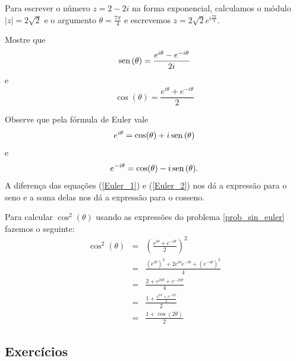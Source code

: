 \begin{ex}Para escrever o número $z=2-2i$ na forma exponencial, calculamos o módulo $|z|=2\sqrt{2}$ e o argumento $\theta=\frac{7\pi}{4}$ e escrevemos $z=2\sqrt{2}e^{i\frac{7\pi}{4}}$. 
\end{ex}
\begin{ex}{\label{prob_sin_euler}}Mostre que
\begin{equation}
\operatorname{sen}\,(\theta)=\frac{e^{i\theta}-e^{-i\theta}}{2i}
\end{equation}
e
\begin{equation}
\cos(\theta)=\frac{e^{i\theta}+e^{-i\theta}}{2}
\end{equation}

Observe que pela fórmula de Euler vale
\begin{equation}{\label{Euler_1}}
e^{i\theta}=\cos(\theta)+i\operatorname{sen}\,(\theta)
\end{equation}
e
\begin{equation}{\label{Euler_2}}
e^{-i\theta}=\cos(\theta)-i\operatorname{sen}\,(\theta).
\end{equation}
A diferença das equações (\ref{Euler_1}) e (\ref{Euler_2}) nos dá a expressão para o seno e a soma delas nos dá a expressão para o cosseno.
\end{ex}
\begin{ex}Para calcular $\cos^2(\theta)$ usando as expressões do problema \ref{prob_sin_euler} fazemos o seguinte:
\begin{eqnarray*}
\cos^2(\theta)&=&\left(\frac{e^{i\theta}+e^{-i\theta}}{2}\right)^2\\
&=&\frac{\left(e^{i\theta}\right)^2+2e^{i\theta}e^{-i\theta}+\left(e^{-i\theta}\right)^2}{4}\\
&=&\frac{2+e^{2i\theta}+e^{-2i\theta}}{4}\\
&=&\frac{1+\frac{e^{2i\theta}+e^{-2i\theta}}{2}}{2}\\
&=&\frac{1+\cos(2\theta)}{2}
\end{eqnarray*}
\end{ex}
\subsection*{Exercícios}

